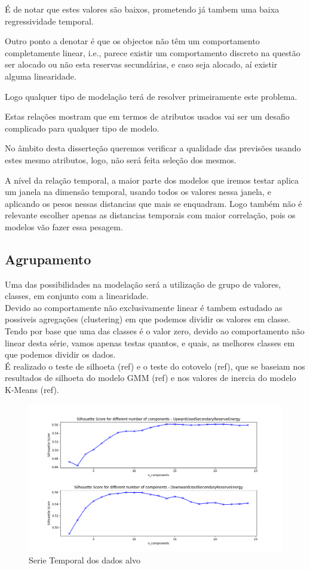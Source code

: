 É de notar que estes valores são baixos, prometendo já tambem uma baixa regressividade temporal.

Outro ponto a denotar é que os objectos não têm um comportamento completamente linear, i.e., parece existir um comportamento discreto na questão ser alocado ou não esta reservas secundárias, e caso seja alocado, aí existir alguma linearidade.

Logo qualquer tipo de modelação terá de resolver primeiramente este problema.

Estas relações mostram que em termos de atributos usados vai ser um desafio complicado para qualquer tipo de modelo.

No âmbito desta disserteção queremos verificar a qualidade das previsões usando estes mesmo atributos, logo, não será feita seleção dos mesmos.

A nível da relação temporal, a maior parte dos modelos que iremos testar aplica um janela na dimensão temporal, usando todos os valores nessa janela, e aplicando os pesos nessas distancias que mais se enquadram. Logo também não é relevante escolher apenas as distancias temporais com maior correlação, pois os modelos vão fazer essa pesagem.

\subsection{Agrupamento \label{se:clustering}}

Uma das possibilidades na modelação será a utilização de grupo de valores, classes, em conjunto com a linearidade. \\
Devido ao comportamente não exclusivamente linear é tambem estudado as possiveis agregações (clustering) em que podemos dividir os valores em classe. \\
Tendo por base que uma das classes é o valor zero, devido ao comportamento não linear desta série, vamos apenas testas quantos, e quais, as melhores classes em que podemos dividir os dados. \\
É realizado o teste de silhoeta (ref) e o teste do cotovelo (ref), que se baseiam nos resultados de silhoeta do modelo GMM (ref) e nos valores de inercia do modelo K-Means (ref). \\

\begin{figure}[H]
  \centering
  \includegraphics[width=\textwidth]{../plots/silhouette_score.png}
  \caption{Serie Temporal dos dados alvo}
\end{figure}


